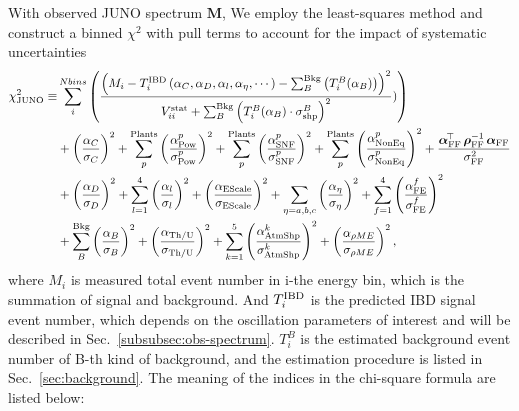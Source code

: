 With observed JUNO spectrum $\boldsymbol{M}$, We employ the least-squares method and construct a binned $\chi^2$ with pull terms to account for the impact of systematic uncertainties 
\begin{equation}
    \begin{split}
        \chi^2_{\rm JUNO} \equiv &\sum_i^{Nbins}{\left(\frac{\left(M_i-T_i^{\rm IBD}\left(\alpha_C,\alpha_D,\alpha_l,\alpha_\eta,\dotsb\right)-\sum_B^{\rm Bkg}{\left(T_i^{B}(\alpha_B)\right)}\right)^2}{V_{ii}^{\rm stat}+\sum_B^{\rm Bkg}{\left(T_i^{B}(\alpha_B)\cdot \sigma_{\rm shp}^B\right)^2}})\right)}\\
        &+\left(\frac{\alpha_C}{\sigma_C}\right)^2+\sum_p^{\rm Plants}{\left(\frac{\alpha_{\rm Pow}^p}{\sigma_{\rm Pow}^p}\right)^2}+\sum_p^{\rm Plants}{\left(\frac{\alpha_{\rm SNF}^p}{\sigma_{\rm SNF}^p}\right)^2}+\sum_p^{\rm Plants}{\left(\frac{\alpha_{\rm NonEq}^p}{\sigma_{\rm NonEq}^p}\right)^2}+\frac{\boldsymbol{\alpha}_{\mathrm{FF}}^{\!\top}\,\boldsymbol{\rho}_{\mathrm{FF}}^{-1}\,\boldsymbol{\alpha}_{\mathrm{FF}}}{\sigma_{\mathrm{FF}}^{2}}\\
        &+\left(\frac{\alpha_D}{\sigma_D}\right)^2+\sum_{l=1}^{4}{\left(\frac{\alpha_l}{\sigma_l}\right)^2}+\left(\frac{\alpha_{\rm EScale}}{\sigma_{\rm EScale}}\right)^2+\sum_{\eta=a,b,c}\left(\frac{\alpha_{\eta}}{\sigma_{\eta}}\right)^2+\sum_{f=1}^{4}\left(\frac{\alpha_{\rm FE}^{f}}{\sigma_{\rm FE}^{f}}\right)^2\\
        &+\sum_B^{\rm Bkg}{\left(\frac{\alpha_B}{\sigma_B}\right)^2}+\left(\frac{\alpha_{\rm Th/U}}{\sigma_{\rm Th/U}}\right)^2+\sum_{k=1}^{5}{\left(\frac{\alpha^k_{\rm AtmShp}}{\sigma^k_{\rm AtmShp}}\right)^2}+\left(\frac{\alpha_{\rho ME}}{\sigma_{\rho ME}}\right)^2,
    \end{split}
    \label{eq:chisq:JUNO}
\end{equation}
where $M_i$ is measured total event number in i-the energy bin, which is the summation of signal and background. And $T_i^{\rm IBD}$ is the predicted IBD signal event number, which depends on the oscillation parameters of interest and will be described in Sec.~\ref{subsubsec:obs-spectrum}. $T_i^{B}$ is the estimated background event number of B-th kind of background, and the estimation procedure is listed in Sec.~\ref{sec:background}. The meaning of the indices in the chi-square formula are listed below:
